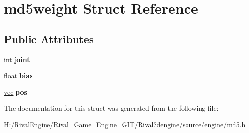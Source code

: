 \hypertarget{structmd5weight}{}\section{md5weight Struct Reference}
\label{structmd5weight}
\subsection*{Public Attributes}
\begin{DoxyCompactItemize}
\item 
\mbox{\label{structmd5weight_a38bf36146195ecbd9f7ba748cd0fee08}} 
int {\bfseries joint}
\item 
\mbox{\label{structmd5weight_a742a00b672eab2eae5199691ef0ca519}} 
float {\bfseries bias}
\item 
\mbox{\label{structmd5weight_ab2b0312815f7ca058cfb1b19fd9333c2}} 
\hyperlink{structvec}{vec} {\bfseries pos}
\end{DoxyCompactItemize}


The documentation for this struct was generated from the following file\+:\begin{DoxyCompactItemize}
\item 
H\+:/\+Rival\+Engine/\+Rival\+\_\+\+Game\+\_\+\+Engine\+\_\+\+G\+I\+T/\+Rival3dengine/source/engine/md5.\+h\end{DoxyCompactItemize}
